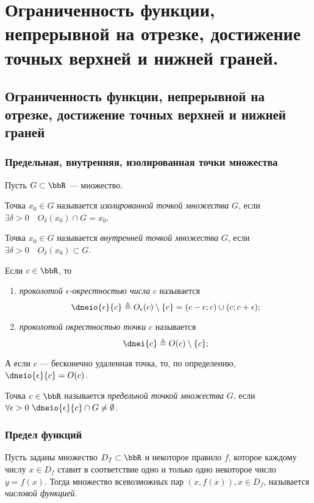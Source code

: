 \chapter{Ограниченность функции, непрерывной на отрезке, достижение точных верхней и нижней граней.}

\section{Ограниченность функции, непрерывной на отрезке, достижение точных верхней и нижней граней}

\subsection{Предельная, внутренняя, изолированная точки множества}
Пусть $G \subset \bbR$ --- множество.
\begin{defn}
Точка $x_0 \in G$ называется \textit{изолированной точкой множества} $G$, если $\exists \delta >0\quad  O_\delta(x_0) \cap G = x_0$.
\end{defn}

\begin{defn}
Точка $x_0 \in G$ называется \textit{внутренней точкой множества} $G$, если $\exists \delta >0\quad O_\delta(x_0) \subset G$.
\end{defn}

\begin{defn}
Если $c \in \bbR$, то 
\begin{enumerate}
\item
\textit{проколотой $\epsilon$-окрестностью числа} $c$ называется $$\dneio{\epsilon}{c} \triangleq O_\epsilon(c)\setminus\{c\}=(c-\epsilon;c)\cup(c;c+\epsilon);$$
\item
\textit{проколотой окрестностью точки} $c$ называется $$\dnei{c} \triangleq O(c)\setminus \{c\};$$
\end{enumerate}
\textbullet\; А если $c$ --- бесконечно удаленная точка, то, по определению, $\dneio{\epsilon}{c}= O (c) $.
\end{defn}

\begin{defn}
Точка $c \in \bbR$ называется \textit{предельной точкой множества} $G$, если $\forall \epsilon >0 \ \dneio{\epsilon}{c} \cap G \ne \emptyset$.
\end{defn}

\subsection{Предел функций}
\begin{defn}
Пусть заданы множество $D_f \subset \bbR$ и некоторое правило $f$, которое каждому числу $x\in D_f$ ставит в соответствие одно и только одно некоторое число $y=f(x)$. Тогда множество всевозможных пар $(x, f(x)), x\in D_f$, называется \textit{числовой функцией}.
\end{defn}

